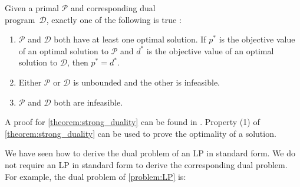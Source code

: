 \begin{theorem} \label{theorem:strong_duality}
    Given a primal $\mathcal{P}$ and corresponding dual \\program~$\mathcal{D}$, exactly one of the following is true \cite{noauthor_numerical_2006}:
    \begin{enumerate}
        \item $\mathcal{P}$ and $\mathcal{D}$ both have at least one optimal solution. If $p^*$ is the objective value of an optimal solution to $\mathcal{P}$ and $d^*$ is the objective value of an optimal solution to $\mathcal{D}$, then $p^*=d^*$.
        \item Either $\mathcal{P}$ or $\mathcal{D}$ is unbounded and the other is infeasible. 
        \item $\mathcal{P}$ and $\mathcal{D}$ both are infeasible.
    \end{enumerate}
\end{theorem}
A proof for \cref{theorem:strong_duality} can be found in \cite{aps_mosek_nodate}. Property (1) of \cref{theorem:strong_duality} can be used to prove the optimality of a solution. 

We have seen how to derive the dual problem of an LP in standard form. We do not require an LP in standard form to derive the corresponding dual problem. For example, the dual problem of \cref{problem:LP} is: 



\newpage
